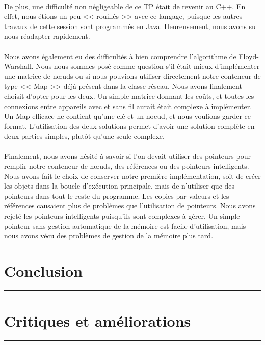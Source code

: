 \documentclass[10pt,letterpaper]{article}
\begin{document}
\\
De plus, une difficulté non négligeable de ce TP était de revenir au C++. 
En effet, nous étions un peu << rouillés >> avec ce langage, puisque les autres travaux de cette session sont programmés en Java. 
Heureusement, nous avons su nous réadapter rapidement.\\
\\
Nous avons également eu des difficultés à bien comprendre l’algorithme de Floyd-Warshall. 
Nous nous sommes posé comme question s’il était mieux d’implémenter une matrice de nœuds 
ou si nous pouvions utiliser directement notre conteneur de type << Map >> déjà présent dans la classe réseau. 
Nous avons finalement choisit d’opter pour les deux. Un simple matrice donnant les coûts, 
et toutes les connexions entre appareils avec et sans fil aurait était complexe à implémenter. 
Un Map efficace ne contient qu’une clé et un noeud, et nous voulions garder ce format. 
L’utilisation des deux solutions permet d’avoir une solution complète en deux parties simples, plutôt qu’une seule complexe.\\
\\
Finalement, nous avons hésité à savoir si l’on devait utiliser des pointeurs pour remplir notre conteneur de nœuds, 
des références ou des pointeurs intelligents. 
Nous avons fait le choix de conserver notre première implémentation, soit de créer les objets dans la boucle d’exécution principale, 
mais de n’utiliser que des pointeurs dans tout le reste du programme. 
Les copies par valeurs et les références causaient plus de problèmes que l’utilisation de pointeurs. 
Nous avons rejeté les pointeurs intelligents puisqu’ils sont complexes à gérer. 
Un simple pointeur sans gestion automatique de la mémoire est facile d’utilisation, mais nous avons vécu des problèmes de gestion de la mémoire plus tard.



\newpage
\section{Conclusion}
\hrule
\vspace{1em}
\lipsum[4]



\vspace{2em}
\section{Critiques et améliorations}
\hrule
\vspace{1em}
\lipsum[5]
\end{document}
